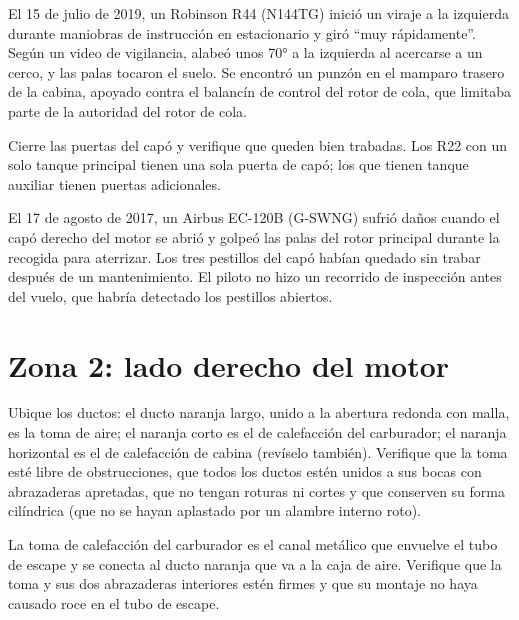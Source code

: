 \begin{caso}
El 15 de julio de 2019, un Robinson R44 (N144TG) inició un viraje a la izquierda durante maniobras de instrucción en estacionario y giró ``muy rápidamente''. Según un video de vigilancia, alabeó unos 70° a la izquierda al acercarse a un cerco, y las palas tocaron el suelo. Se encontró un punzón en el mamparo trasero de la cabina, apoyado contra el balancín de control del rotor de cola, que limitaba parte de la autoridad del rotor de cola.
\end{caso}

Cierre las puertas del capó y verifique que queden bien trabadas. Los R22 con un solo tanque principal tienen una sola puerta de capó; los que tienen tanque auxiliar tienen puertas adicionales.

\begin{caso}
El 17 de agosto de 2017, un Airbus EC-120B (G-SWNG) sufrió daños cuando el capó derecho del motor se abrió y golpeó las palas del rotor principal durante la recogida para aterrizar. Los tres pestillos del capó habían quedado sin trabar después de un mantenimiento. El piloto no hizo un recorrido de inspección antes del vuelo, que habría detectado los pestillos abiertos.
\end{caso}

\section{Zona 2: lado derecho del motor}

Ubique los ductos: el ducto naranja largo, unido a la abertura redonda con malla, es la toma de aire; el naranja corto es el de calefacción del carburador; el naranja horizontal es el de calefacción de cabina (revíselo también). Verifique que la toma esté libre de obstrucciones, que todos los ductos estén unidos a sus bocas con abrazaderas apretadas, que no tengan roturas ni cortes y que conserven su forma cilíndrica (que no se hayan aplastado por un alambre interno roto).

La toma de calefacción del carburador es el canal metálico que envuelve el tubo de escape y se conecta al ducto naranja que va a la caja de aire. Verifique que la toma y sus dos abrazaderas interiores estén firmes y que su montaje no haya causado roce en el tubo de escape.

